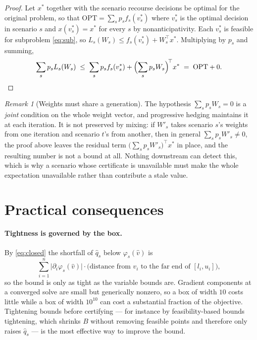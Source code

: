 \documentclass[11pt]{article}
\theoremstyle{plain}
\theoremstyle{remark}
\newtheorem{remark}[lemma]{Remark}
\newcommand{\W}{W}
\newcommand{\vhat}{\hat{v}}
\newcommand{\qhat}{\hat{q}}
\newcommand{\OPT}{\mathrm{OPT}}
\begin{document}
\begin{proof}
Let $x^{*}$ together with the scenario recourse decisions be optimal for the
original problem, so that $\OPT = \sum_s p_s f_s(v_s^{*})$ where $v_s^{*}$ is the
optimal decision in scenario $s$ and $x(v_s^{*}) = x^{*}$ for every $s$ by
nonanticipativity.  Each $v_s^{*}$ is feasible for subproblem \eqref{eq:sub}, so
$L_s(\W_s) \le f_s(v_s^{*}) + \W_s^{\top} x^{*}$.  Multiplying by $p_s$ and
summing,
\[
  \sum_s p_s L_s(\W_s)
  \;\le\; \sum_s p_s f_s(v_s^{*}) + \Bigl( \sum_s p_s \W_s \Bigr)^{\!\top} x^{*}
  \;=\; \OPT + 0 . \qedhere
\]
\end{proof}

\begin{remark}[Weights must share a generation]\label{rem:mixed}
The hypothesis $\sum_s p_s \W_s = 0$ is a \emph{joint} condition on the whole
weight vector, and progressive hedging maintains it at each iteration.  It is
not preserved by mixing: if $\W'_s$ takes scenario $s$'s weights from one
iteration and scenario $t$'s from another, then in general
$\sum_s p_s \W'_s \ne 0$, the proof above leaves the residual term
$\bigl(\sum_s p_s \W'_s\bigr)^{\top} x^{*}$ in place, and the resulting number
is not a bound at all.  Nothing downstream can detect this, which is why a
scenario whose certificate is unavailable must make the whole expectation
unavailable rather than contribute a stale value.
\end{remark}

\section{Practical consequences}\label{sec:practical}

\paragraph{Tightness is governed by the box.}
By \eqref{eq:closed} the shortfall of $\qhat_s$ below $\varphi_s(\vhat)$ is
\[
  \sum_{i=1}^{n} \bigl| \partial_i \varphi_s(\vhat) \bigr| \cdot
  \bigl( \text{distance from } \vhat_i \text{ to the far end of } [l_i,u_i] \bigr),
\]
so the bound is only as tight as the variable bounds are.  Gradient components
at a converged solve are small but generically nonzero, so a box of width $10$
costs little while a box of width $10^{10}$ can cost a substantial fraction of
the objective.  Tightening bounds before certifying --- for instance by
feasibility-based bounds tightening, which shrinks $B$ without removing feasible
points and therefore only raises $\qhat_s$ --- is the most effective way to
improve the bound.
\end{document}
